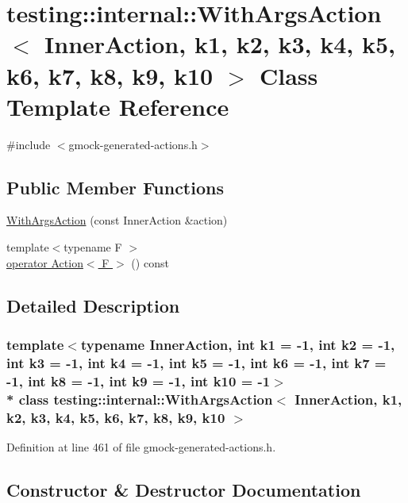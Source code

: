 \hypertarget{classtesting_1_1internal_1_1_with_args_action}{}\section{testing\+:\+:internal\+:\+:With\+Args\+Action$<$ Inner\+Action, k1, k2, k3, k4, k5, k6, k7, k8, k9, k10 $>$ Class Template Reference}
\label{classtesting_1_1internal_1_1_with_args_action}


{\ttfamily \#include $<$gmock-\/generated-\/actions.\+h$>$}

\subsection*{Public Member Functions}
\begin{DoxyCompactItemize}
\item 
\hyperlink{classtesting_1_1internal_1_1_with_args_action_ab408f9c56c8f25564ef554b984e1c926}{With\+Args\+Action} (const Inner\+Action \&action)
\item 
{\footnotesize template$<$typename F $>$ }\\\hyperlink{classtesting_1_1internal_1_1_with_args_action_a33a5550ee1fa0b86b5d1cc918e573e97}{operator Action$<$ F $>$} () const 
\end{DoxyCompactItemize}


\subsection{Detailed Description}
\subsubsection*{template$<$typename Inner\+Action, int k1 = -\/1, int k2 = -\/1, int k3 = -\/1, int k4 = -\/1, int k5 = -\/1, int k6 = -\/1, int k7 = -\/1, int k8 = -\/1, int k9 = -\/1, int k10 = -\/1$>$\\*
class testing\+::internal\+::\+With\+Args\+Action$<$ Inner\+Action, k1, k2, k3, k4, k5, k6, k7, k8, k9, k10 $>$}



Definition at line 461 of file gmock-\/generated-\/actions.\+h.



\subsection{Constructor \& Destructor Documentation}
